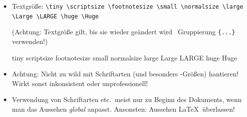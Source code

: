\begin{frame}[<+->][fragile]
	\begin{itemize}
		\item Textgröße: \lstinline!\tiny \scriptsize \footnotesize \small \normalsize \large \Large \LARGE \huge \Huge!
		
		(Achtung: Textgröße gilt, bis sie wieder geändert wird \textrightarrow\ Gruppierung \lstinline!{...}! verwenden!)
		
		{\rmfamily
		\tiny tiny \scriptsize scriptsize \footnotesize footnotesize \small small \normalsize normalsize \large large \Large Large \LARGE LARGE \huge huge \Huge Huge}
		\item Achtung: Nicht zu wild mit Schriftarten (und besonders -Größen) hantieren! Wirkt sonst inkonsistent oder unprofessionell!
		\item Verwendung von Schriftarten etc.\ meist nur zu Beginn des Dokuments, wenn man das Aussehen \emph{global} anpasst. Ansonsten: Aussehen \LaTeX\ überlassen!
	\end{itemize}
\end{frame}

